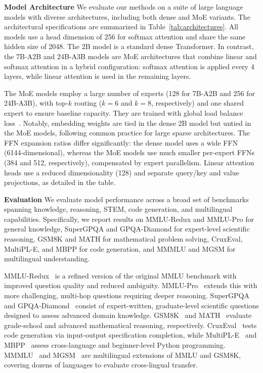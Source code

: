 \documentclass{article} %
\begin{document}
\textbf{Model Architecture}
We evaluate our methods on a suite of large language models with diverse architectures, including both dense and MoE variants. 
The architectural specifications are summarized in Table~\ref{tab:architectures}. 
All models use a head dimension of 256 for softmax attention and share the same hidden size of 2048. The 2B model is a standard dense Transformer. 
In contrast, the 7B-A2B and 24B-A3B models are MoE architectures that combine linear and softmax attention in a hybrid configuration: softmax attention is applied every 4 layers, while linear attention is used in the remaining layers.

The MoE models employ a large number of experts (128 for 7B-A2B and 256 for 24B-A3B), with top-$k$ routing ($k=6$ and $k=8$, respectively) and one shared expert to ensure baseline capacity. 
They are trained with global load balance loss~\citep{global_balance}.
Notably, embedding weights are tied in the dense 2B model but untied in the MoE models, following common practice for large sparse architectures. The FFN expansion ratios differ significantly: the dense model uses a wide FFN (6144-dimensional), whereas the MoE models use much smaller per-expert FFNs (384 and 512, respectively), compensated by expert parallelism. 
Linear attention heads use a reduced dimensionality (128) and separate query/key and value projections, as detailed in the table.

\textbf{Evaluation}
We evaluate model performance across a broad set of benchmarks spanning knowledge, reasoning, STEM, code generation, and multilingual capabilities. 
Specifically, we report results on MMLU-Redux and MMLU-Pro for general knowledge, SuperGPQA and GPQA-Diamond for expert-level scientific reasoning, GSM8K and MATH for mathematical problem solving, CruxEval, MultiPL-E, and MBPP for code generation, and MMMLU and MGSM for multilingual understanding.

MMLU-Redux~\cite{gema2024are} is a refined version of the original MMLU benchmark with improved question quality and reduced ambiguity. 
MMLU-Pro~\cite{wang2024mmlu} extends this with more challenging, multi-hop questions requiring deeper reasoning. 
SuperGPQA~\cite{du2025supergpqa} and GPQA-Diamond~\cite{reinhardt2023gpqa} consist of expert-written, graduate-level scientific questions designed to assess advanced domain knowledge. 
GSM8K~\cite{cobbe2021training} and MATH~\cite{hendrycks2021measuring} evaluate grade-school and advanced mathematical reasoning, respectively. 
CruxEval~\cite{gu2024cruxeval} tests code generation via input-output specification completion, while MultiPL-E~\cite{cassano2023multipl} and MBPP~\cite{austen2021mbpp} assess cross-language and beginner-level Python programming. 
MMMLU~\cite{openai2024mmmlu} and MGSM~\cite{shi2022language} are multilingual extensions of MMLU and GSM8K, covering dozens of languages to evaluate cross-lingual transfer.
\end{document}
